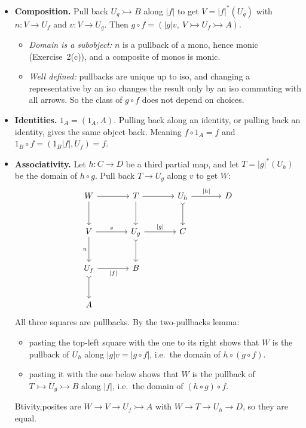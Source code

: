 \documentclass[11pt]{article}
\begin{document}
\begin{itemize}
  \item \textbf{Composition.} Pull back $U_g \rightarrowtail B$ along $|f|$ to
    get $V = |f|^*(U_g)$ with $n : V \to U_f$ and $v : V \to U_g$. Then $g
    \circ f = (|g| v,\ V \rightarrowtail U_f \rightarrowtail A)$.
    \begin{itemize}
      \item \emph{Domain is a subobject:} $n$ is a pullback of a mono, hence monic
        (Exercise~2(c)), and a composite of monos is monic.
      \item \emph{Well defined:} pullbacks are unique up to iso, and changing a
        representative by an iso changes the result only by an iso commuting with
        all arrows. So the class of $g \circ f$ does not depend on choices.
    \end{itemize}
  \item \textbf{Identities.} $1_A = (1_A, A)$. Pulling back along an identity,
    or pulling back an identity, gives the same object back. Meaning $f \circ 1_A
    = f$ and $1_B \circ f = (1_B |f|, U_f) = f$.
  \item \textbf{Associativity.} Let $h : C \to D$ be a third partial map, and
    let $T = |g|^*(U_h)$ be the domain of $h \circ g$. Pull back $T \to U_g$
    along $v$ to get $W$:
    \[
      \begin{tikzcd}[sep=large]
        W \ar[r] \ar[d] & T \ar[r] \ar[d] & U_h \ar[r, "|h|"] \ar[d, tail] & D \\
        V \ar[r, "v"] \ar[d, "n"'] & U_g \ar[r, "|g|"] \ar[d, tail] & C & \\
        U_f \ar[r, "|f|"'] \ar[d, tail] & B & & \\
        A & & &
      \end{tikzcd}
    \]
    All three squares are pullbacks. By the two-pullbacks lemma:
    \begin{itemize}
      \item pasting the top-left square with the one to its right shows that
        $W$ is the pullback of $U_h$ along $|g| v = |g \circ f|$, i.e.\ the domain
        of $h \circ (g \circ f)$.
      \item pasting it with the one below shows that $W$ is the pullback of
        $T \rightarrowtail U_g \rightarrowtail B$ along $|f|$, i.e.\ the domain of
        $(h \circ g) \circ f$.
    \end{itemize}
    Btivity,posites are $W \to V \to U_f \rightarrowtail A$ with
    $W \to T \to U_h \to D$, so they are equal.
\end{itemize}
\end{document}

